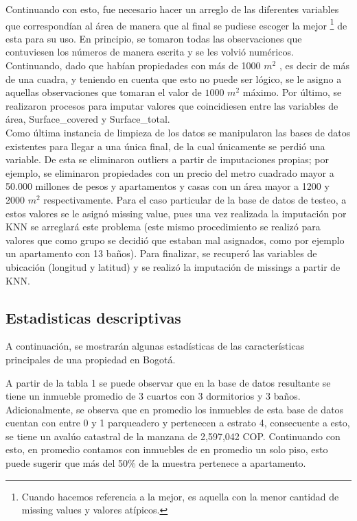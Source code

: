 \documentclass[10pt]{article}
\begin{document}
Continuando con esto, fue necesario hacer un arreglo de las diferentes variables que correspondían al área de manera que al final se pudiese escoger la mejor \footnote{Cuando hacemos referencia a la mejor, es aquella con la menor cantidad de missing values y valores atípicos.} de esta para su uso. En principio, se tomaron todas las observaciones que contuviesen los números de manera escrita y se les volvió numéricos. Continuando, dado que habían propiedades con más de 1000 $m^2$ , es decir de más de una cuadra, y teniendo en cuenta que esto no puede ser lógico, se le asigno a aquellas observaciones que tomaran el valor de $1000$ $m^2$ máximo. Por último, se realizaron procesos para imputar valores que coincidiesen entre las variables de área, Surface\_covered y Surface\_total.\\

Como última instancia de limpieza de los datos se manipularon las bases de datos existentes para llegar a una única final, de la cual únicamente se perdió una variable. De esta se eliminaron outliers a partir de imputaciones propias; por ejemplo, se eliminaron propiedades con un precio del metro cuadrado mayor a 50.000 millones de pesos y apartamentos y casas con un área mayor a 1200 y 2000 $m^2$ respectivamente. Para el caso particular de la base de datos de testeo, a estos valores se le asignó missing value, pues una vez realizada la imputación por KNN se arreglará este problema (este mismo procedimiento se realizó para valores que como grupo se decidió que estaban mal asignados, como por ejemplo un apartamento con 13 baños). Para finalizar, se recuperó las variables de ubicación (longitud y latitud) y se realizó la imputación de missings a partir de KNN.

\subsection{Estadisticas descriptivas}
A continuación, se mostrarán algunas estadísticas de las características principales de una propiedad en Bogotá.



A partir de la tabla 1 se puede observar que en la base de datos resultante se tiene un inmueble promedio de 3 cuartos con 3 dormitorios y 3 baños. Adicionalmente, se observa que en promedio los inmuebles de esta base de datos cuentan con entre 0 y 1 parqueadero y pertenecen a estrato 4, consecuente a esto, se tiene un avalúo catastral de la manzana de 2,597,042 COP. Continuando con esto, en promedio contamos con inmuebles de en promedio un solo piso, esto puede sugerir que más del 50\% de la muestra pertenece a apartamento. \\
\end{document}

